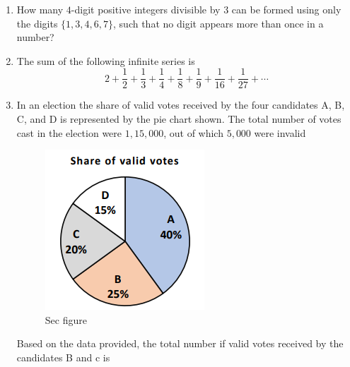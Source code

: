 \documentclass[journal]{IEEEtran}
\numberwithin{equation}{enumi}
\numberwithin{figure}{enumi}
\begin{document}
\begin{enumerate}[start=1, label={Q\arabic*.}]
\item How many $4$-digit positive integers divisible by $3$ can be formed using only the digits $\{1, 3, 4, 6, 7\}$, such that no digit appears more than once in a number?
\begin{enumerate}[label=(\Alph*)]
  \end{enumerate}
\item The sum of the following infinite series is 
 \[
 2 + \frac{1}{2} + \frac{1}{3} + \frac{1}{4} + \frac{1}{8} + \frac{1}{9} + \frac{1}{16} + \frac{1}{27} + \cdots                              \]
 \begin{enumerate}[label=(\Alph*)]
  \end{enumerate}
  \newpage
\item In an election the share of valid votes received by the four candidates A, B, C, and D is represented by the pie chart shown. The total number of votes cast in the election were $1,15,000$, out of which $5,000$ were invalid
 \begin{figure}[H]
     \centering
     \includegraphics[width=0.5\linewidth]{figs/fig2.png}
     \caption{Sec figure}
     \label{fig:sec}
 \end{figure}
 Based on the data provided, the total number if valid votes received by the candidates B and c is


\end{enumerate}
\end{document}
